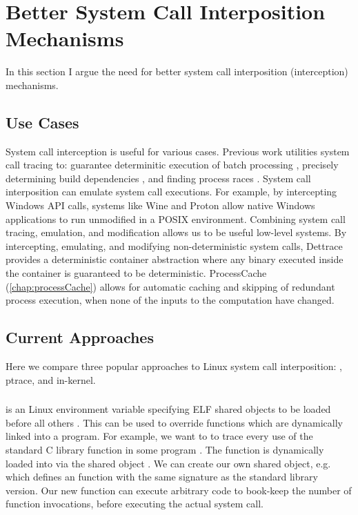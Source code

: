 \section{Better System Call Interposition Mechanisms}
In this section I argue the need for better system call interposition (interception) mechanisms.

\subsection{Use Cases}
System call interception is useful for various cases. Previous work utilities system call tracing to: guarantee determinitic execution of batch processing \citep{detflow},  precisely determining build dependencies \citep{perfectDependencies}, and finding process races \citep{racepro}. System call interposition can emulate system call executions. For example, by intercepting Windows API calls, systems like Wine \citep{wine} and Proton \citep{valve-proton} allow native Windows applications to run unmodified in a POSIX environment. Combining system call tracing, emulation, and modification allows us to be useful low-level systems. By intercepting, emulating, and modifying non-deterministic system calls, Dettrace \citep{dettrace} provides a deterministic container abstraction where any binary executed inside the container is guaranteed to be deterministic. ProcessCache (\ref{chap:processCache}) allows for automatic caching and skipping of redundant process execution, when none of the inputs to the computation have changed.

\subsection{Current Approaches}
Here we compare three popular approaches to Linux system call interposition: \ldpreload, ptrace, and in-kernel.

\subsubsection{\ldpreload{}}
\ldpreload{} is an Linux environment variable specifying ELF shared objects to be loaded before all others \cite{ld}. This can be used to override functions which are dynamically linked into a program. For example, we want to to trace every use of the  standard C library function in some program . The  function is dynamically loaded into  via the shared object . We can create our own shared object, e.g.  which defines an  function with the same signature as the standard library version. Our new  function can execute arbitrary code to book-keep the number of function invocations, before executing the actual  system call.

